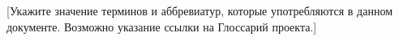 [Укажите значение терминов и аббревиатур, которые употребляются в данном документе. Возможно указание ссылки на Глоссарий проекта.]